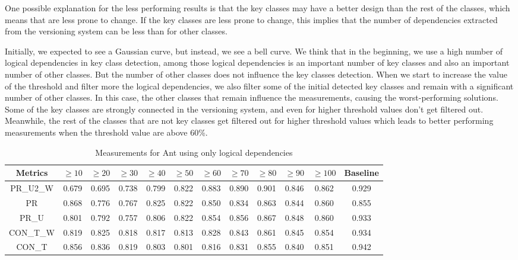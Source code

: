 \documentclass[runningheads]{comsis2}
\begin{document}
One possible explanation for the less performing results is that the key classes may have a better design than the rest of the classes, which means that are less prone to change. If the key classes are less prone to change, this implies that the number of dependencies extracted from the versioning system can be less than for other classes.

Initially, we expected to see a Gaussian curve, but instead, we see a bell curve.  We think that in the beginning, we use a high number of logical dependencies in key class detection, among those logical dependencies is an important number of key classes and also an important number of other classes. But the number of other classes does not influence the key classes detection. When we start to increase the value of the threshold and filter more the logical dependencies, we also filter some of the initial detected key classes and remain with a significant number of other classes. In this case, the other classes that remain influence the measurements, causing the worst-performing solutions. 
Some of the key classes are strongly connected in the versioning system, and even for higher threshold values don't get filtered out. Meanwhile, the rest of the classes that are not key classes get filtered out for higher threshold values which leads to better performing measurements when the threshold value are above 60\%. 

\begin{table}[!h]
\setlength\tabcolsep{3.5pt}
\caption{Measurements for Ant using only logical dependencies}
\label{tab:measurementshistory:ant}
\centering
\begin{tabular}{|c|cccccccccc|c|}
\hline
Metrics &	$\geq10$	&	$\geq20$		&	$\geq30$		&	$\geq40$		&	$\geq50$		&	$\geq60$		&	$\geq70$		&	$\geq80$		&	$\geq90$		&	$\geq100$		&	Baseline \\
\hline

PR\_U2\_W	&	0.679	&	0.695	&	0.738	&	0.799	&	0.822	&	0.883	&	0.890	&	0.901	&	0.846	&	0.862	&	0.929	\\
PR	&	0.868	&	0.776	&	0.767	&	0.825	&	0.822	&	0.850	&	0.834	&	0.863	&	0.844	&	0.860	&	0.855	\\
PR\_U	&	0.801	&	0.792	&	0.757	&	0.806	&	0.822	&	0.854	&	0.856	&	0.867	&	0.848	&	0.860	&	0.933	\\
CON\_T\_W	&	0.819	&	0.825	&	0.818	&	0.817	&	0.813	&	0.828	&	0.843	&	0.861	&	0.845	&	0.854	&	0.934	\\
CON\_T	&	0.856	&	0.836	&	0.819	&	0.803	&	0.801	&	0.816	&	0.831	&	0.855	&	0.840	&	0.851	&	0.942	\\


\hline
\end{tabular}
\end{table}
\end{document}
